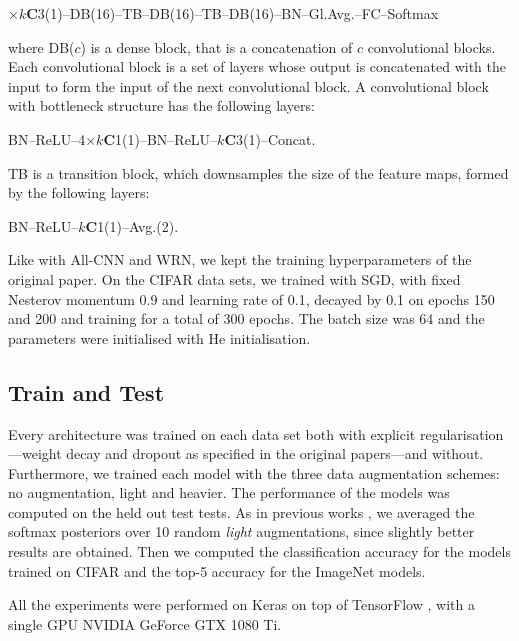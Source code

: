 {\begin{center}
$\times k$\textbf{C}3(1)--DB(16)--TB--DB(16)--TB--DB(16)--BN--Gl.Avg.--FC--Softmax
\end{center}
%
where DB($c$) is a dense block, that is a concatenation of $c$ convolutional blocks. Each convolutional block is a set of layers whose output is concatenated with the input to form the input of the next convolutional block. A convolutional block with bottleneck structure has the following layers:

\begin{center}
\centering
BN--ReLU--4$\times k$\textbf{C}1(1)--BN--ReLU--$k$\textbf{C}3(1)--Concat.
\end{center}

TB is a transition block, which downsamples the size of the feature maps, formed by the following layers:

\begin{center}
\centering
BN--ReLU--$k$\textbf{C}1(1)--Avg.(2).
\end{center}

Like with All-CNN and WRN, we kept the training hyperparameters of the original paper. On the CIFAR data sets, we trained with SGD, with fixed Nesterov momentum 0.9 and learning rate of 0.1, decayed by 0.1 on epochs 150 and 200 and training for a total of 300 epochs. The batch size was 64 and the parameters were initialised with He initialisation.

\subsection{Train and Test}
Every architecture was trained on each data set both with explicit regularisation---weight decay and dropout as specified in the original papers---and without. Furthermore, we trained each model with the three data augmentation schemes: no augmentation, light and heavier. The performance of the models was computed on the held out test tests. As in previous works \citep{krizhevsky2012alexnet, simonyan2014}, we averaged the softmax posteriors over 10 random \textit{light} augmentations, since slightly better results are obtained. Then we computed the classification accuracy for the models trained on CIFAR and the top-5 accuracy for the ImageNet models.

All the experiments were performed on Keras \citep{chollet2015keras} on top of TensorFlow \citep{tensorflow2015}, with a single GPU NVIDIA GeForce GTX 1080 Ti.

}
